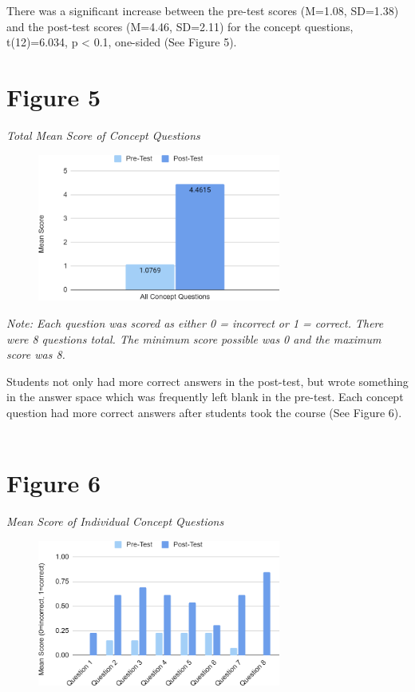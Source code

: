 \documentclass[11.5pt]{sig-alternate}
\begin{document}
\begin{large}
\begin{figure}[h!]
\end{figure}

There was a significant increase between the pre-test scores (M=1.08, SD=1.38) and the post-test scores (M=4.46, SD=2.11) for the concept questions, t(12)=6.034, p < 0.1, one-sided (See Figure 5).

\section*{Figure 5}
\textit{Total Mean Score of Concept Questions}
\begin{figure}[h!]
\centering
\includegraphics[width=8cm]{figure 5.png}
\end{figure}

\textit{Note: Each question was scored as either 0 = incorrect or 1 = correct. There were 8 questions total. The minimum score possible was 0 and the maximum score was 8.}

Students not only had more correct answers in the post-test, but wrote something in the answer space which was frequently left blank in the pre-test. Each concept question had more correct answers after students took the course (See Figure 6).
\\
\\
\section*{Figure 6}
\textit{Mean Score of Individual Concept Questions}
\begin{figure}[h!]
\centering
\includegraphics[width=8cm]{figure 6.png}


\end{figure}
\end{large}
\end{document}
